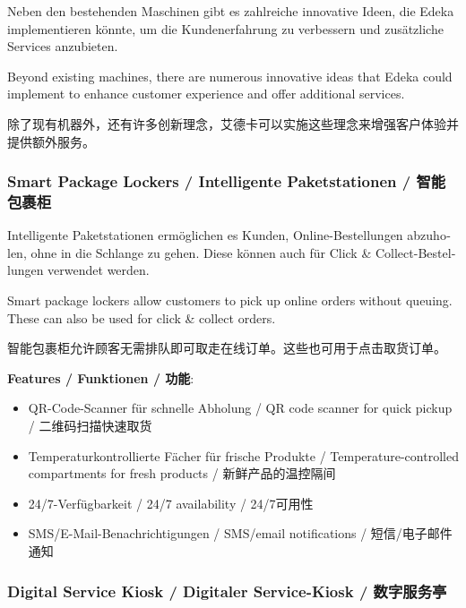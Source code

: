 \begin{otherlanguage}{ngerman}
Neben den bestehenden Maschinen gibt es zahlreiche innovative Ideen, die Edeka implementieren könnte, um die Kundenerfahrung zu verbessern und zusätzliche Services anzubieten.
\end{otherlanguage}

Beyond existing machines, there are numerous innovative ideas that Edeka could implement to enhance customer experience and offer additional services.

除了现有机器外，还有许多创新理念，艾德卡可以实施这些理念来增强客户体验并提供额外服务。

\subsubsection{Smart Package Lockers / Intelligente Paketstationen / 智能包裹柜}

\begin{otherlanguage}{ngerman}
Intelligente Paketstationen ermöglichen es Kunden, Online-Bestellungen abzuholen, ohne in die Schlange zu gehen. Diese können auch für Click \& Collect-Bestellungen verwendet werden.
\end{otherlanguage}

Smart package lockers allow customers to pick up online orders without queuing. These can also be used for click \& collect orders.

智能包裹柜允许顾客无需排队即可取走在线订单。这些也可用于点击取货订单。

\textbf{Features / Funktionen / 功能}:
\begin{itemize}
    \item QR-Code-Scanner für schnelle Abholung / QR code scanner for quick pickup / 二维码扫描快速取货
    \item Temperaturkontrollierte Fächer für frische Produkte / Temperature-controlled compartments for fresh products / 新鲜产品的温控隔间
    \item 24/7-Verfügbarkeit / 24/7 availability / 24/7可用性
    \item SMS/E-Mail-Benachrichtigungen / SMS/email notifications / 短信/电子邮件通知
\end{itemize}

\subsubsection{Digital Service Kiosk / Digitaler Service-Kiosk / 数字服务亭}

